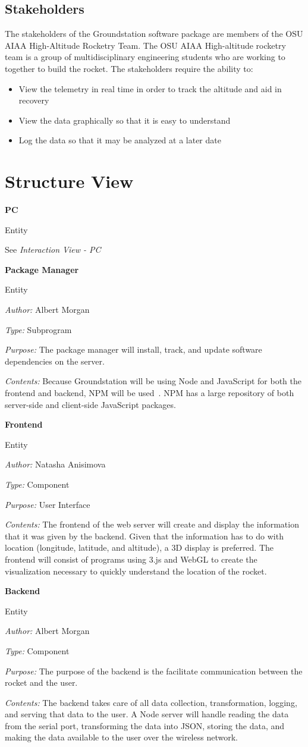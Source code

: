 \documentclass[10pt,draftclsnofoot,onecolumn]{IEEEtran}
\newcommand{\newentity}[5]{

	\noindent\textbf{#2}
	
	\noindent Entity
	
	\noindent\textit{Author:} {#1}
		
	\noindent\textit{Type:} {#3}
	
	\noindent\textit{Purpose:} {#4}

	\noindent\textit{Contents:} {#5}
	\vspace{.5cm}

}
\newcommand{\entityref}[2]{

	\noindent\textbf{#1}
	
	\noindent Entity
	
	\noindent See \textit{#2}

	\vspace{.5cm}
}
\begin{document}
	\subsection{Stakeholders}
	The stakeholders of the Groundstation software package are members of the \ac{OSU} \ac{AIAA} High-Altitude Rocketry Team.
	The \ac{OSU} \ac{AIAA} High-altitude rocketry team is a group of multidisciplinary engineering students who are working to together to build the rocket.
	The stakeholders require the ability to:
	\begin{itemize}
		\item View the telemetry in real time in order to track the altitude and aid in recovery
		\item View the data graphically so that it is easy to understand
		\item Log the data so that it may be analyzed at a later date
	\end{itemize}

	\section{Structure View}
		
	
	
	

	\entityref{PC}
	{Interaction View - PC}

	\newentity
	{Albert Morgan}
	{Package Manager}
	{Subprogram}
	{
		The package manager will install, track, and update software dependencies on the server.
	}
	{
		Because Groundstation will be using Node and JavaScript for both the frontend and backend, \ac{NPM} will be used~\cite{npm}. \ac{NPM} has a large repository of both server-side and client-side JavaScript packages.
	}
	
	\newentity
	{Natasha Anisimova}
	{Frontend}
	{Component}
	{User Interface}
	{
		The frontend of the web server will create and display the information that it was given by the backend. Given
		that the information has to do with location
		(longitude, latitude, and altitude), a 3D display is preferred. The
		frontend will consist of programs using 3.js and WebGL to create the visualization necessary to quickly understand the
		location of the rocket.
	}

	\newentity
	{Albert Morgan}
	{Backend}
	{Component}
	{
		The purpose of the backend is the facilitate communication between the rocket and the user.
	}
	{
		The backend takes care of all data collection, transformation, logging, and serving that data to the user.
		A Node server will handle reading the data from the serial port, transforming the data into JSON,
		storing the data, and making the data available to the user over the wireless network.
	}
\end{document}
